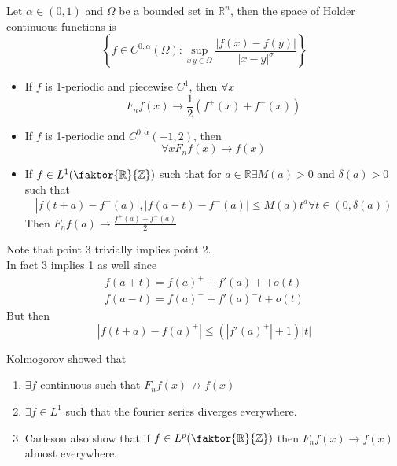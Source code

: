 \documentclass[../main.tex]{subfiles}
\begin{document}
\begin{defn}
	Let $\alpha\in ( 0,1) $ and $\Omega$ be a bounded set in $ \mathbb{R}^{n}$, then the space of Holder continuous functions is
	\[ 
	\left\{ f\in C^{0,\alpha}( \Omega) : \sup_{x\,y \in \Omega} \frac{|f( x) -f( y) |}{|x-y|^{\sigma}} \right\} 
	\]
	
\end{defn}
\begin{thm}[Dirichlet]
	\begin{itemize}
	\item If $f$ is 1-periodic and piecewise $C^{1}$, then $\forall x $ 
		\[ 
			F_n f( x) \to \frac{1}{2}(  f^{+}( x) + f^{-}( x)  )
		\]
	
	\item If $f$ is 1-periodic and $C^{0,\alpha}( -1,2) $, then
		\[ 
		\forall  x F_nf( x) \to f( x) 
		\]
		
	\item If $f\in L^{1}( \faktor { \mathbb{R}} { \mathbb{Z}} ) $ such that for $a \in \mathbb{R} \exists M( a) >0$ and $\delta( a) >0$ such that
		\[ 
		|f( t+a) - f^{+}( a) |, |f( a-t) - f^{-}( a) | \leq M( a) t^{a}\forall t \in ( 0,\delta( a) ) 
		\]
	Then $ F_nf( a) \to \frac{f^{+}( a)+ f^{-}( a) 	}{2}$ 
	\end{itemize}
\end{thm}
\begin{rmq}
Note that point 3 trivially implies point 2.\\
In fact $3$ implies 1 as well since
\begin{align*}
f( a+t) = f( a) ^{+} + f'( a)+ + o( t) \\
f( a-t) = f( a)^{-} + f'( a)^{-}t + o( t) 	
\end{align*}
But then
\[ 
|f( t+a) - f( a)^{+}| \leq  (  |f'( a)^{+}|+ 1) |t|
\]
\end{rmq}
Kolmogorov showed that
\begin{enumerate}
\item $\exists f$ continuous such that $F_nf ( x) \not\to f( x) $ 
\item $\exists f \in L^{1}$ such that the fourier series diverges everywhere.
\item Carleson also show that if $f\in L^{p}(  \faktor { \mathbb{R}} { \mathbb{Z}} ) $ then $F_n f( x) \to f( x)  $ almost everywhere.
\end{enumerate}
\end{document}
